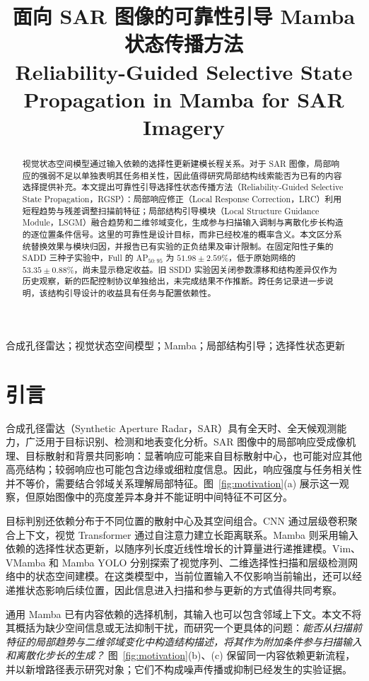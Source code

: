 \documentclass[journal]{IEEEtran}
\title{\LARGE 面向 SAR 图像的可靠性引导 Mamba 状态传播方法\\[0.5em]
{\large Reliability-Guided Selective State Propagation in Mamba for SAR Imagery}}
\author{}
\begin{document}
\maketitle
\begin{abstract}
视觉状态空间模型通过输入依赖的选择性更新建模长程关系。对于 SAR 图像，局部响应的强弱不足以单独表明其任务相关性，因此值得研究局部结构线索能否为已有的内容选择提供补充。本文提出可靠性引导选择性状态传播方法（Reliability-Guided Selective State Propagation，RGSP）：局部响应修正（Local Response Correction，LRC）利用短程趋势与残差调整扫描前特征；局部结构引导模块（Local Structure Guidance Module，LSGM）融合趋势和二维邻域变化，生成参与扫描输入调制与离散化步长构造的逐位置条件信号。这里的可靠性是设计目标，而非已经校准的概率含义。本文区分系统替换效果与模块归因，并报告已有实验的正负结果及审计限制。在固定阳性子集的 SADD 三种子实验中，Full 的 AP$_{50:95}$ 为 $51.98\pm2.59\%$，低于原始网络的 $53.35\pm0.88\%$，尚未显示稳定收益。旧 SSDD 实验因关闭参数漂移和结构差异仅作为历史观察，新的匹配控制协议单独给出，未完成结果不作推断。跨任务记录进一步说明，该结构引导设计的收益具有任务与配置依赖性。
\end{abstract}
\begin{IEEEkeywords}
合成孔径雷达；视觉状态空间模型；Mamba；局部结构引导；选择性状态更新
\end{IEEEkeywords}

\section{引言}\label{sec:intro}
合成孔径雷达（Synthetic Aperture Radar，SAR）具有全天时、全天候观测能力，广泛用于目标识别、检测和地表变化分析。SAR 图像中的局部响应受成像机理、目标散射和背景共同影响：显著响应可能来自目标散射中心，也可能对应其他高亮结构；较弱响应也可能包含边缘或细粒度信息。因此，响应强度与任务相关性并不等价，需要结合邻域关系理解局部特征。图~\ref{fig:motivation}(a) 展示这一观察，但原始图像中的亮度差异本身并不能证明中间特征不可区分。

目标判别还依赖分布于不同位置的散射中心及其空间组合。CNN 通过层级卷积聚合上下文\cite{resnet2015}，视觉 Transformer 通过自注意力建立长距离联系\cite{vit2020}。Mamba 则采用输入依赖的选择性状态更新，以随序列长度近线性增长的计算量进行递推建模\cite{mamba2023}。Vim、VMamba 和 Mamba YOLO 分别探索了视觉序列、二维选择性扫描和层级检测网络中的状态空间建模\cite{vim2024,vmamba2024,mambayolo2024}。在这类模型中，当前位置输入不仅影响当前输出，还可以经递推状态影响后续位置，因此信息进入扫描和参与更新的方式值得共同考察。

通用 Mamba 已有内容依赖的选择机制，其输入也可以包含邻域上下文。本文不将其概括为缺少空间信息或无法抑制干扰，而研究一个更具体的问题：\emph{能否从扫描前特征的局部趋势与二维邻域变化中构造结构描述，将其作为附加条件参与扫描输入和离散化步长的生成？} 图~\ref{fig:motivation}(b)、(c) 保留同一内容依赖更新流程，并以新增路径表示研究对象；它们不构成噪声传播或抑制已经发生的实验证据。
\end{document}
